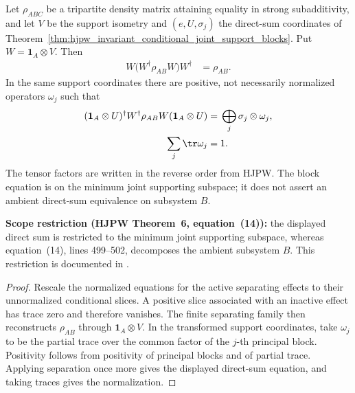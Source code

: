 \begin{theorem}
    \label{thm:hjpw_markov_bipartite_joint_support_blocks}
    \leanok
    Let $\rho_{ABC}$ be a tripartite density matrix attaining equality in
    strong subadditivity, and let $V$ be the support isometry and
    $(e,U,\sigma_j)$ the direct-sum coordinates of
    Theorem~\ref{thm:hjpw_invariant_conditional_joint_support_blocks}. Put
    $W=\mathbf 1_A\otimes V$. Then
    \begin{align}
        W\bigl(W^\dagger\rho_{AB}W\bigr)W^\dagger
        &={}\rho_{AB}.
    \end{align}
    In the same support coordinates there are positive, not necessarily
    normalized operators $\omega_j$ such that
    \begin{align}
        (\mathbf 1_A\otimes U)^\dagger
        W^\dagger\rho_{AB}W
        (\mathbf 1_A\otimes U)
        &={}\bigoplus_j\sigma_j\otimes\omega_j,
        \\
        \sum_j\tr\omega_j&=1.
    \end{align}
    The tensor factors are written in the reverse order from HJPW. The block
    equation is on the minimum joint supporting subspace; it does not assert
    an ambient direct-sum equivalence on subsystem $B$.

    \textbf{Scope restriction (HJPW Theorem~6, equation~(14)):}
    the displayed direct sum is restricted to the minimum joint supporting
    subspace, whereas equation~(14), lines 499--502, decomposes the ambient
    subsystem $B$. This restriction is documented in
    .
\end{theorem}

\begin{proof}
    \leanok
    Rescale the normalized equations for the active separating effects to
    their unnormalized conditional slices. A positive slice associated with
    an inactive effect has trace zero and therefore vanishes. The finite
    separating family then reconstructs $\rho_{AB}$ through
    $\mathbf 1_A\otimes V$. In the transformed support coordinates, take
    $\omega_j$ to be the partial trace over the common factor of the
    $j$-th principal block. Positivity follows from positivity of principal
    blocks and of partial trace. Applying separation once more gives the
    displayed direct-sum equation, and taking traces gives the normalization.
\end{proof}

